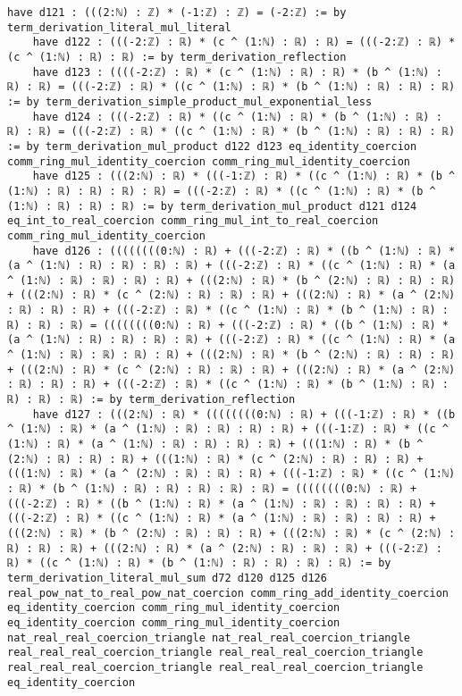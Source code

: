 \documentclass{article}
\begin{document}
\begin{tcolorbox}[colback=white!10, width=\linewidth]
\begin{lstlisting}[language=Lean4]
    have d121 : (((2:ℕ) : ℤ) * (-1:ℤ) : ℤ) = (-2:ℤ) := by term_derivation_literal_mul_literal
    have d122 : (((-2:ℤ) : ℝ) * (c ^ (1:ℕ) : ℝ) : ℝ) = (((-2:ℤ) : ℝ) * (c ^ (1:ℕ) : ℝ) : ℝ) := by term_derivation_reflection
    have d123 : ((((-2:ℤ) : ℝ) * (c ^ (1:ℕ) : ℝ) : ℝ) * (b ^ (1:ℕ) : ℝ) : ℝ) = (((-2:ℤ) : ℝ) * ((c ^ (1:ℕ) : ℝ) * (b ^ (1:ℕ) : ℝ) : ℝ) : ℝ) := by term_derivation_simple_product_mul_exponential_less
    have d124 : (((-2:ℤ) : ℝ) * ((c ^ (1:ℕ) : ℝ) * (b ^ (1:ℕ) : ℝ) : ℝ) : ℝ) = (((-2:ℤ) : ℝ) * ((c ^ (1:ℕ) : ℝ) * (b ^ (1:ℕ) : ℝ) : ℝ) : ℝ) := by term_derivation_mul_product d122 d123 eq_identity_coercion comm_ring_mul_identity_coercion comm_ring_mul_identity_coercion
    have d125 : (((2:ℕ) : ℝ) * (((-1:ℤ) : ℝ) * ((c ^ (1:ℕ) : ℝ) * (b ^ (1:ℕ) : ℝ) : ℝ) : ℝ) : ℝ) = (((-2:ℤ) : ℝ) * ((c ^ (1:ℕ) : ℝ) * (b ^ (1:ℕ) : ℝ) : ℝ) : ℝ) := by term_derivation_mul_product d121 d124 eq_int_to_real_coercion comm_ring_mul_int_to_real_coercion comm_ring_mul_identity_coercion
    have d126 : ((((((((0:ℕ) : ℝ) + (((-2:ℤ) : ℝ) * ((b ^ (1:ℕ) : ℝ) * (a ^ (1:ℕ) : ℝ) : ℝ) : ℝ) : ℝ) + (((-2:ℤ) : ℝ) * ((c ^ (1:ℕ) : ℝ) * (a ^ (1:ℕ) : ℝ) : ℝ) : ℝ) : ℝ) + (((2:ℕ) : ℝ) * (b ^ (2:ℕ) : ℝ) : ℝ) : ℝ) + (((2:ℕ) : ℝ) * (c ^ (2:ℕ) : ℝ) : ℝ) : ℝ) + (((2:ℕ) : ℝ) * (a ^ (2:ℕ) : ℝ) : ℝ) : ℝ) + (((-2:ℤ) : ℝ) * ((c ^ (1:ℕ) : ℝ) * (b ^ (1:ℕ) : ℝ) : ℝ) : ℝ) : ℝ) = ((((((((0:ℕ) : ℝ) + (((-2:ℤ) : ℝ) * ((b ^ (1:ℕ) : ℝ) * (a ^ (1:ℕ) : ℝ) : ℝ) : ℝ) : ℝ) + (((-2:ℤ) : ℝ) * ((c ^ (1:ℕ) : ℝ) * (a ^ (1:ℕ) : ℝ) : ℝ) : ℝ) : ℝ) + (((2:ℕ) : ℝ) * (b ^ (2:ℕ) : ℝ) : ℝ) : ℝ) + (((2:ℕ) : ℝ) * (c ^ (2:ℕ) : ℝ) : ℝ) : ℝ) + (((2:ℕ) : ℝ) * (a ^ (2:ℕ) : ℝ) : ℝ) : ℝ) + (((-2:ℤ) : ℝ) * ((c ^ (1:ℕ) : ℝ) * (b ^ (1:ℕ) : ℝ) : ℝ) : ℝ) : ℝ) := by term_derivation_reflection
    have d127 : (((2:ℕ) : ℝ) * ((((((((0:ℕ) : ℝ) + (((-1:ℤ) : ℝ) * ((b ^ (1:ℕ) : ℝ) * (a ^ (1:ℕ) : ℝ) : ℝ) : ℝ) : ℝ) + (((-1:ℤ) : ℝ) * ((c ^ (1:ℕ) : ℝ) * (a ^ (1:ℕ) : ℝ) : ℝ) : ℝ) : ℝ) + (((1:ℕ) : ℝ) * (b ^ (2:ℕ) : ℝ) : ℝ) : ℝ) + (((1:ℕ) : ℝ) * (c ^ (2:ℕ) : ℝ) : ℝ) : ℝ) + (((1:ℕ) : ℝ) * (a ^ (2:ℕ) : ℝ) : ℝ) : ℝ) + (((-1:ℤ) : ℝ) * ((c ^ (1:ℕ) : ℝ) * (b ^ (1:ℕ) : ℝ) : ℝ) : ℝ) : ℝ) : ℝ) = ((((((((0:ℕ) : ℝ) + (((-2:ℤ) : ℝ) * ((b ^ (1:ℕ) : ℝ) * (a ^ (1:ℕ) : ℝ) : ℝ) : ℝ) : ℝ) + (((-2:ℤ) : ℝ) * ((c ^ (1:ℕ) : ℝ) * (a ^ (1:ℕ) : ℝ) : ℝ) : ℝ) : ℝ) + (((2:ℕ) : ℝ) * (b ^ (2:ℕ) : ℝ) : ℝ) : ℝ) + (((2:ℕ) : ℝ) * (c ^ (2:ℕ) : ℝ) : ℝ) : ℝ) + (((2:ℕ) : ℝ) * (a ^ (2:ℕ) : ℝ) : ℝ) : ℝ) + (((-2:ℤ) : ℝ) * ((c ^ (1:ℕ) : ℝ) * (b ^ (1:ℕ) : ℝ) : ℝ) : ℝ) : ℝ) := by term_derivation_literal_mul_sum d72 d120 d125 d126 real_pow_nat_to_real_pow_nat_coercion comm_ring_add_identity_coercion eq_identity_coercion comm_ring_mul_identity_coercion eq_identity_coercion comm_ring_mul_identity_coercion nat_real_real_coercion_triangle nat_real_real_coercion_triangle real_real_real_coercion_triangle real_real_real_coercion_triangle real_real_real_coercion_triangle real_real_real_coercion_triangle eq_identity_coercion

\end{lstlisting}
\end{tcolorbox}
\end{document}
